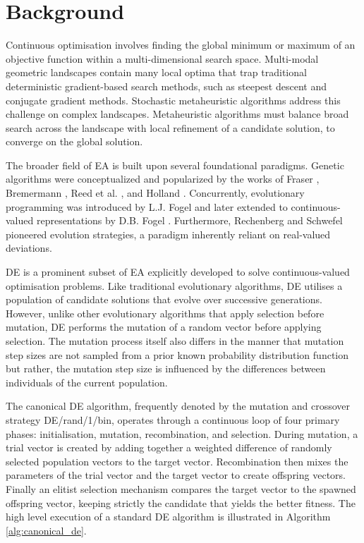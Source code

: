\documentclass[conference]{IEEEtran}
\begin{document}
\section{Background}

    Continuous optimisation involves finding the global minimum or maximum of an objective function within a multi-dimensional search 
    space. Multi-modal geometric landscapes contain many local optima that trap traditional deterministic gradient-based 
    search methods, such as steepest descent and conjugate gradient methods. Stochastic metaheuristic algorithms address this challenge on complex landscapes. 
    Metaheuristic algorithms must balance broad search across the landscape with local refinement of a candidate solution, to converge on the global solution.  

    The broader field of EA is built upon several foundational paradigms. Genetic algorithms were conceptualized and 
    popularized by the works of Fraser \cite{fraser1957}, Bremermann \cite{bremermann1962}, 
    Reed et al. \cite{reed1967}, and Holland \cite{holland1975}. Concurrently, 
    evolutionary programming was introduced by L.J. Fogel \cite{fogel_lj1962} and later extended to 
    continuous-valued representations by D.B. Fogel \cite{fogel_db1995}. Furthermore, Rechenberg 
    \cite{rechenberg1973} and Schwefel \cite{schwefel1977} pioneered evolution strategies, a paradigm 
    inherently reliant on real-valued deviations.

    DE is a prominent subset of EA explicitly developed to solve continuous-valued 
    optimisation problems.  Like traditional evolutionary algorithms, DE utilises a population of candidate solutions that evolve over successive 
    generations. However, unlike other evolutionary algorithms that apply selection before mutation, DE performs the mutation of a random vector 
    before applying selection. The mutation process itself also differs in the manner that mutation step sizes are not sampled 
    from a prior known probability distribution function but rather, the mutation step size is influenced by the differences between 
    individuals of the current population. 

    The canonical DE algorithm, frequently denoted by the mutation and crossover strategy DE/rand/1/bin, operates through a continuous 
    loop of four primary phases: initialisation, mutation, recombination, and selection. During mutation, a trial vector is created by 
    adding together a weighted difference of randomly selected population vectors to the target vector. Recombination then mixes the 
    parameters of the trial vector and the target vector to create offspring vectors. Finally an elitist selection mechanism compares 
    the target vector to the spawned offspring vector, keeping strictly the candidate that yields the better fitness. The high level 
    execution of a standard DE algorithm is illustrated in Algorithm \ref{alg:canonical_de}. 
\end{document}
